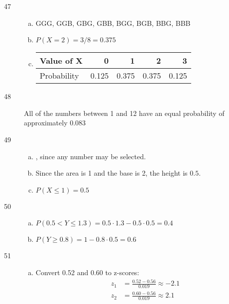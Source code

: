 \documentclass[letterpaper, landscape]{exam}
\begin{document}
\begin{description}
      \newpage

      \item[47]
        \begin{enumerate}[(a)]
          \item GGG, GGB, GBG, GBB, BGG, BGB, BBG, BBB
          \item $P(X = 2) = 3/8 = \boxed{ 0.375 }$

          \item
            \begin{tabular}[H]{lrrrr}
              \toprule
              Value of X  & 0     & 1     & 2     & 3 \\
              \midrule
              Probability & 0.125 & 0.375 & 0.375 & 0.125 \\
              \bottomrule
            \end{tabular}
        \end{enumerate}  

      \item[48]
        All of the numbers between 1 and 12 have an equal probability of
        approximately $\boxed{ 0.083 }$

      \item[49]
        \begin{enumerate}[(a)]
          \item {}, since any number may be selected.

          \item Since the area is 1 and the base is 2, the height is $\boxed{ 0.5 }$.

          \item $P(X \leq 1) = \boxed{ 0.5 }$

        \end{enumerate}  

      \item[50]
        \begin{enumerate}[(a)]
          \item $P(0.5 < Y \leq 1.3) = 0.5 \cdot 1.3 - 0.5 \cdot 0.5 = \boxed{ 0.4 }$
          \item $P(Y \geq 0.8) = 1 - 0.8 \cdot 0.5= \boxed{ 0.6 }$
        \end{enumerate}  

      \pagebreak

      \item[51]
        \begin{enumerate}[(a)]
          \item Convert 0.52 and 0.60 to z-scores:
            \begin{align*}
              z_1 & = \frac{0.52 - 0.56}{0.019} \approx -2.1 \\
              z_2 & = \frac{0.60 - 0.56}{0.019} \approx 2.1 \\
            \end{align*}


\end{enumerate}
\end{description}
\end{document}
